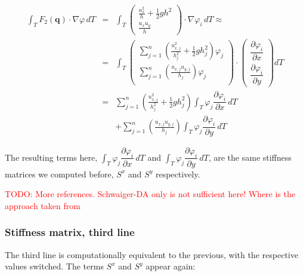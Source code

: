 \documentclass{article}
\newcommand{\todo}[1]{\textcolor{red}{TODO: #1}}
\newcommand{\pd}[2]{\dfrac{\partial #1}{\partial #2}}
\renewcommand{\phi}{\varphi}
\begin{document}
\begin{eqnarray}
  \label{eq:third-integral-second-line-1}
  \int_T F_2(\mathbf{q}) \cdot \nabla \phi \, dT & = &
  \int_T
  \begin{pmatrix}
    \frac{u_x^2}{h} + \frac{1}{2} g h^2 \\ \frac{u_x u_y}{h}
  \end{pmatrix}
  \cdot \nabla \phi_i \, dT \approx \\
  \label{eq:third-integral-second-line-2}
  & = &
  \int_T
  \begin{pmatrix}
    \sum_{j=1}^n \left(\frac{u_{x,j}^2}{h_j^2} + \frac{1}{2} g h_j^2\right) \phi_j \\
    \sum_{j=1}^n \left(\frac{u_{x,j} u_{y,j}}{h_j}\right) \phi_j \\
  \end{pmatrix}
  \cdot
  \begin{pmatrix}
    \pd{\phi_i}{x} \\
    \pd{\phi_i}{y}
  \end{pmatrix} dT \\
  & = & \nonumber \sum_{j=1}^n \left(\frac{u_{x,j}^2}{h_j^2} + \frac{1}{2} g h_j^2\right) \int_T \phi_j \pd{\phi_i}{x} \, dT \\
  & {} & + \nonumber \sum_{j=1}^n \left(\frac{u_{x,j} u_{y,j}}{h_j}\right) \int_T \phi_j \pd{\phi_i}{y} \, dT
\end{eqnarray}

The resulting terms here, $\int_T \phi_j \pd{\phi_i}{x} \, dT$ and $\int_T \phi_j \pd{\phi_i}{y} \, dT$, are the same stiffness matrices we computed before, $S^x$ and $S^y$ respectively.

\todo{More references. Schwaiger-DA only is not sufficient here! Where is the approach taken from}

\subsubsection{Stiffness matrix, third line}

The third line is computationally equivalent to the previous, with the respective values switched. The terms $S^x$ and $S^y$ appear again:
\end{document}
